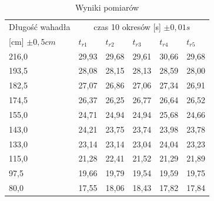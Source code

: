 \documentclass[a4paper,12pt]{article}
\begin{document}
\begin{table}[h]
	\centering
	\begin{tabular}{|l|l|l|l|l|l|}
		\hline
		Długość wahadła  & \multicolumn{5}{c|}{czas 10 okresów [s] $\pm 0,01s$}                                             \\
		{[cm] $\pm 0,5cm$} & $t_{r1}$                                             & $t_{r2}$ & $t_{r3}$ & $t_{r4}$ & $t_{r5}$ \\\hline
		216,0            & 29,93                                                & 29,68    & 29,61    & 30,66    & 29,68    \\\hline
		193,5            & 28,08                                                & 28,15    & 28,13    & 28,59    & 28,00    \\\hline
		182,5            & 27,07                                                & 26,86    & 27,06    & 27,34    & 26,91    \\ \hline
		174,5            & 26,37                                                & 26,25    & 26,77    & 26,64    & 26,52    \\ \hline
		155,0            & 24,71                                                & 24,94    & 24,94    & 25,68    & 24,66    \\ \hline
		143,0            & 24,21                                                & 23,75    & 23,74    & 23,98    & 23,78    \\ \hline
		133,0            & 23,14                                                & 23,14    & 23,04    & 24,04    & 23,23    \\ \hline
		115,0            & 21,28                                                & 22,41    & 21,52    & 21,29    & 21,89    \\ \hline
		97,5             & 19,66                                                & 19,79    & 19,54    & 19,59    & 19,75    \\ \hline
		80,0             & 17,55                                                & 18,06    & 18,43    & 17,82    & 17,84    \\\hline
	\end{tabular}
	\caption{Wyniki pomiarów}
\end{table}
\end{document}
